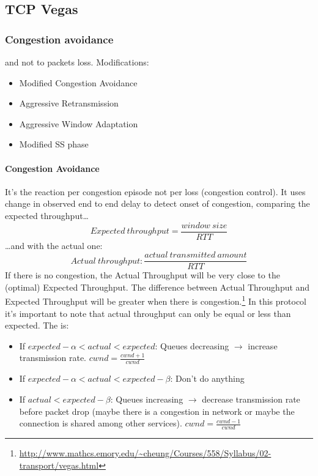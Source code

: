 \subsection{TCP Vegas}

\subsubsection{Congestion avoidance}

 and not to packets loss.
Modifications:
\begin{itemize}
  \item Modified Congestion Avoidance
  \item Aggressive Retransmission
  \item Aggressive Window Adaptation 
  \item Modified SS phase
\end{itemize}

\paragraph*{Congestion Avoidance} It's the reaction per congestion episode not
per loss (congestion control). It uses change in observed end to end delay to
detect onset of congestion, comparing the expected throughput\dots
\begin{equation}
  Expected\ throughput = \frac{window\ size}{RTT}
  \label{eq:tcpvegas:extr}
\end{equation}
\dots and with the actual one:
\begin{equation}
  Actual\ throughput: \frac{actual\ transmitted\ amount}{RTT}
  \label{eq:tcpvegas:actr}
\end{equation}
If there is no congestion, the Actual Throughput will be very close to the
(optimal) Expected Throughput. The difference between Actual Throughput and
Expected Throughput will be greater when there is congestion.\footnote{
  \url{http://www.mathcs.emory.edu/~cheung/Courses/558/Syllabus/02-transport/vegas.html}
}
In this protocol it's important to note that actual throughput can only be equal
or less than expected.
The  is:
\begin{itemize}
\item If $expected - \alpha < actual < expected$: Queues decreasing
  $\rightarrow$ increase transmission rate. $cwnd = \frac{cwnd + 1}{cwnd}$
\item If $expected - \alpha < actual < expected - \beta$: Don’t do anything
\item If $actual < expected - \beta$: Queues increasing $\rightarrow$ decrease
  transmission rate before packet drop (maybe there is a congestion in network
  or maybe the connection is shared among other services).
  $cwnd = \frac{cwnd - 1}{cwnd}$
\end{itemize}

